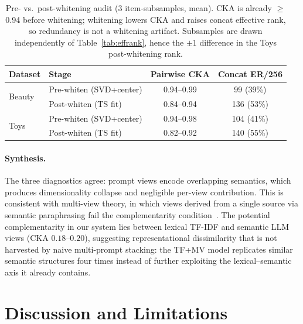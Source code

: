 \documentclass[sigconf,natbib=true,anonymous]{acmart}
\newcommand{\tfidf}{\textsc{TF-IDF}\xspace}
\newcommand{\llm}{\textsc{LLM}\xspace}
\newcommand{\tfmv}{\textsc{TF+MV}\xspace}
\begin{document}
\begin{table}[t]
\centering
\caption{%
Pre- vs.\ post-whitening audit (3 item-subsamples, mean).
CKA is already $\ge$0.94 before whitening; whitening lowers CKA and raises concat effective rank, so redundancy is not a whitening artifact.
Subsamples are drawn independently of Table~\ref{tab:effrank}, hence the $\pm 1$ difference in the Toys post-whitening rank.%
}
\label{tab:cka-prepost}
\small
\begin{tabular}{@{}llcc@{}}
\toprule
Dataset & Stage & Pairwise CKA & Concat ER/256 \\
\midrule
\multirow{2}{*}{Beauty}
 & Pre-whiten (SVD+center)  & 0.94--0.99 & 99 (39\%) \\
 & Post-whiten (TS fit)     & 0.84--0.94 & 136 (53\%) \\
\midrule
\multirow{2}{*}{Toys}
 & Pre-whiten (SVD+center)  & 0.94--0.98 & 104 (41\%) \\
 & Post-whiten (TS fit)     & 0.82--0.92 & 140 (55\%) \\
\bottomrule
\end{tabular}
\end{table}

\paragraph{Synthesis.}
The three diagnostics agree: prompt views encode overlapping semantics, which produces dimensionality collapse and negligible per-view contribution.
This is consistent with multi-view theory, in which views derived from a single source via semantic paraphrasing fail the complementarity condition~\cite{xu2013multiview}.
The potential complementarity in our system lies between lexical \tfidf and semantic \llm views (CKA $0.18$--$0.20$), suggesting representational dissimilarity that is not harvested by naive multi-prompt stacking: the \tfmv model replicates similar semantic structures four times instead of further exploiting the lexical--semantic axis it already contains.

\section{Discussion and Limitations}
\label{sec:discussion}
\end{document}

